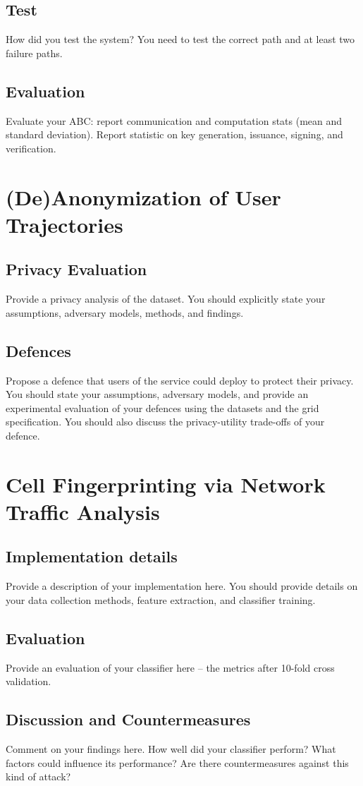 \documentclass[10pt,conference,compsocconf]{IEEEtran}
\begin{document}
\subsection{Test}
How did you test the system?
You need to test the correct path and at least two failure paths.

\subsection{Evaluation}
Evaluate your ABC: report communication and computation stats (mean and standard
deviation). Report statistic on key generation, issuance, signing, and
verification.

\section{(De)Anonymization of User Trajectories}

\subsection{Privacy Evaluation}
Provide a privacy analysis of the dataset. You should explicitly state your assumptions, adversary
models, methods, and findings.

\subsection{Defences}
Propose a defence that users of the service could deploy to protect their privacy.  You
should state your assumptions, adversary models, and provide an experimental evaluation of your
defences using the datasets and the grid specification. You should also discuss the
privacy-utility trade-offs of your defence.

\section{Cell Fingerprinting via Network Traffic Analysis}

\subsection{Implementation details}
Provide a description of your implementation here. You should provide details on your data collection methods, feature extraction, and classifier training.

\subsection{Evaluation}
Provide an evaluation of your classifier here -- the metrics after 10-fold cross validation.

\subsection{Discussion and Countermeasures}
Comment on your findings here. How well did your classifier perform? What factors could influence its performance? Are there countermeasures against this kind of attack?



\end{document}

